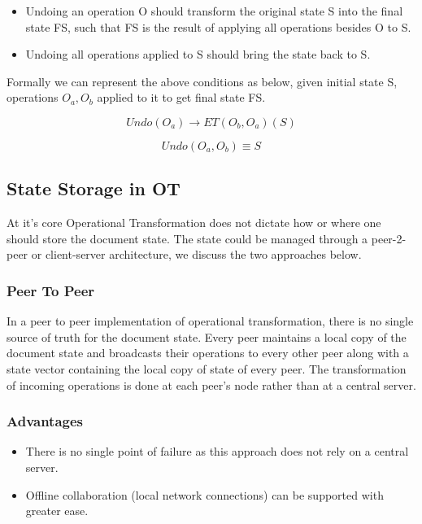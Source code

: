 \documentclass[9pt, titlepage]{article}
\begin{document}
  \begin{itemize}
    \item Undoing an operation O should transform the original state S into the final state FS, such that FS is the result of applying all operations besides O to S.
    \item Undoing all operations applied to S should bring the state back to S. 
  \end{itemize}
  Formally we can represent the above conditions as below, given initial state S, operations \(O_{a}, O_{b}\)
  applied to it to get final state FS.

  \begin{equation}
    Undo(O_{a}) \rightarrow ET(O_{b}, O_{a})(S)
  \end{equation}

  \begin{equation}
    Undo(O_{a}, O_{b}) \equiv S
  \end{equation}

  \subsection{State Storage in OT}
  At it's core Operational Transformation does not dictate how or where one should store the document state.
  The state could be managed through a peer-2-peer or client-server architecture, we discuss the two approaches below.

  \subsubsection{Peer To Peer}
  In a peer to peer implementation of operational transformation, there is no single source of truth for the document state.
  Every peer maintains a local copy of the document state and broadcasts their operations to every other peer
  along with a state vector containing the local copy of state of every peer.
  The transformation of incoming operations is done at each peer's node rather than at a central server.
  
  \subsubsection*{Advantages}
  \begin{itemize}
    \item There is no single point of failure as this approach does not rely on a central server.
    \item Offline collaboration (local network connections) can be supported with greater ease.
  \end{itemize}
\end{document}
